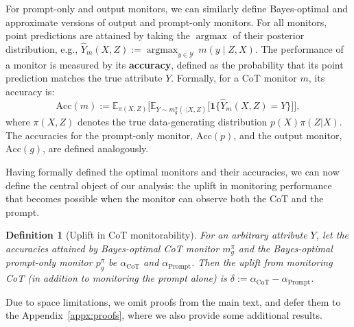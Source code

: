 \documentclass{article}
\theoremstyle{plain}
\newtheorem{definition}[theorem]{Definition}
\newcommand{\argmax}{\mathop{\mathrm{argmax}}}
\begin{document}

For prompt-only and output monitors, we can similarly define Bayes-optimal and approximate versions of output and prompt-only monitors. For all monitors, point predictions are attained by taking the $\argmax$ of their posterior distribution, e.g., $\hat{Y}_m(X,Z) := \argmax_{y \in \mathcal Y}\, m(y \mid Z, X)$.
The performance of a monitor is measured by its \textbf{accuracy}, defined as the probability that its point prediction matches the true attribute $Y$.
Formally, for a CoT monitor $m$, its accuracy is:
\begin{equation}
\label{eq:acc-definition}
\mathrm{Acc}(m) := \mathbb{E}_{\pi(X,Z)}\Big[ \mathbb{E}_{Y \sim m_g^\pi(\cdot|X,Z)} \big[\mathbf{1}\{\hat{Y}_m(X,Z) = Y\}\big] \Big],
\end{equation}
where $\pi(X,Z)$ denotes the true data-generating distribution $p(X)\pi(Z|X)$.
The accuracies for the prompt-only monitor, $\mathrm{Acc}(p)$, and the output monitor, $\mathrm{Acc}(g)$, are defined analogously.

Having formally defined the optimal monitors and their accuracies, we can now define the central object of our analysis: 
the uplift in monitoring performance that becomes possible when the monitor can observe both the CoT and the prompt.

\begin{definition}[Uplift in CoT monitorability]
\label{def:delta-uplift-cot-monitorability}
For an arbitrary attribute $Y$, let the accuracies attained by Bayes-optimal CoT monitor $m_g^\pi$ and the Bayes-optimal prompt-only monitor $p_g^\pi$ be $\alpha_\text{CoT}$ and $\alpha_\text{Prompt}$.
Then the uplift from monitoring CoT (in addition to monitoring the prompt alone) is $\delta := \alpha_\text{CoT} - \alpha_\text{Prompt}$.
\end{definition}

Due to space limitations, we omit proofs from the main text, and defer them to the Appendix~\ref{appx:proofs}, where we also provide some additional results.
\end{document}
